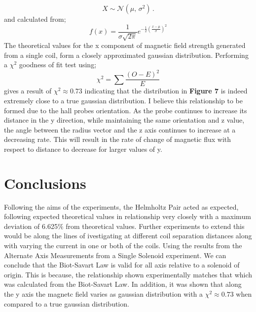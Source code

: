\documentclass{article}
\begin{document}
   \begin{equation}
    X \sim \mathcal{N}(\mu,\,\sigma^{2})\,.
   \end{equation}
   and calculated from;
   \begin{equation}
    {\displaystyle f(x)={\frac {1}{\sigma {\sqrt {2\pi }}}}e^{-{\frac {1}{2}}\left({\frac {x-\mu }{\sigma }}\right)^{2}}}
   \end{equation}
   The theoretical values for the x component of magnetic field strength generated from a single coil, form a closely approximated gaussian distribution.
   \newline Performing a \(\chi^2\) goodness of fit test using;
   \begin{equation}
    \chi^2=\sum \frac{(O - E)^2}{E}
   \end{equation}
   gives a result of \(\chi^2 \approx 0.73\) indicating that the distribution in \textbf{Figure 7} 
   is indeed extremely close to a true gaussian distribution.
   \newline
   \newline
   I believe this relationship to be formed due to the hall probes orientation. As the probe continues to increase its distance in the y direction, while maintaining the same orientation and 
   z value, the angle between the radius vector and the z axis continues to increase at a decreasing rate. This will result in the rate of change of magnetic flux with respect to distance to decrease
   for larger values of y.
   \section{Conclusions}
   Following the aims of the experiments, the Helmholtz Pair acted as expected, following expected theoretical values in relationship very closely
   with a maximum deviation of 6.625\(\%\) from theoretical values. Further experiments to extend this would be along the lines of ivestigating at different coil separation distances
   along with varying the current in one or both of the coils.
   \newline
   Using the results from the Alternate Axis Measurements from a Single Solenoid experiment. 
   We can conclude that the Biot-Savart Law is valid for all axis relative to a solenoid of origin. This is because, the relationship shown experimentally matches that which was calculated 
   from the Biot-Savart Law.
   \newline
   \newline In addition, it was shown that along the y axis the magnetc field varies as gaussian distribution with a \(\chi^2 \approx 0.73\) when compared to a true gaussian distribution.
\end{document}
